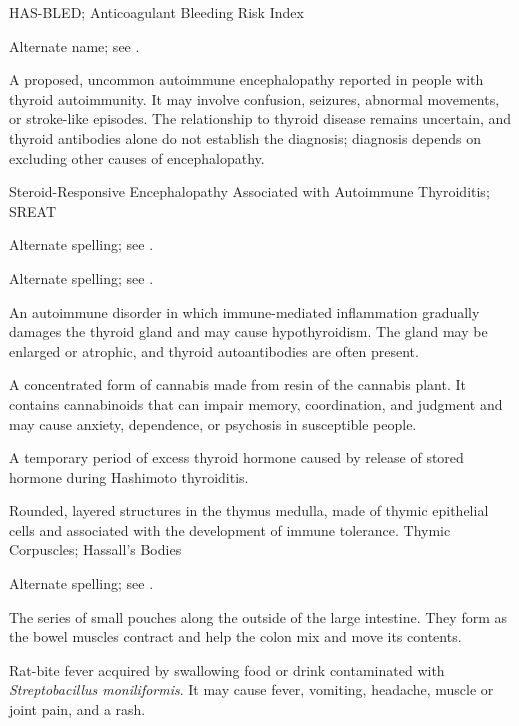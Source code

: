\synonyms
HAS-BLED; Anticoagulant Bleeding Risk Index

 Alternate name; see .

 A proposed, uncommon autoimmune encephalopathy reported in people with thyroid autoimmunity. It may involve confusion, seizures, abnormal movements, or stroke-like episodes. The relationship to thyroid disease remains uncertain, and thyroid antibodies alone do not establish the diagnosis; diagnosis depends on excluding other causes of encephalopathy.

\synonyms
Steroid-Responsive Encephalopathy Associated with Autoimmune Thyroiditis; SREAT

 Alternate spelling; see .

 Alternate spelling; see .

 An autoimmune disorder in which immune-mediated inflammation gradually damages the thyroid gland and may cause
hypothyroidism. The gland may be enlarged or atrophic, and thyroid autoantibodies are
often present.

 A concentrated form of cannabis made from resin of the cannabis plant. It contains cannabinoids that can impair memory, coordination, and judgment and may cause anxiety, dependence, or psychosis in susceptible people.

 A temporary period of excess thyroid hormone caused by release of stored hormone during Hashimoto thyroiditis.

 Rounded, layered structures in the thymus medulla, made of thymic epithelial cells and associated with the development of immune tolerance.
\synonyms
Thymic Corpuscles; Hassall's Bodies

 Alternate spelling; see .

 The series of small pouches along the outside of the large intestine. They form as the bowel muscles contract and help the colon mix and move its contents.

 Rat-bite fever acquired by swallowing food or drink contaminated with \textit{Streptobacillus moniliformis}. It may cause fever, vomiting, headache, muscle or joint pain, and a rash.

